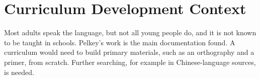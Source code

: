 \documentclass[12pt]{article}
\begin{document}
\section{Curriculum Development Context}
Most adults speak the language, but not all young people do, and it is not known to be taught in schools. Pelkey's work is the main documentation found. A curriculum would need to build primary materials, such as an orthography and a primer, from scratch. Further searching, for example in Chinese-language sources, is needed.
\end{document}
